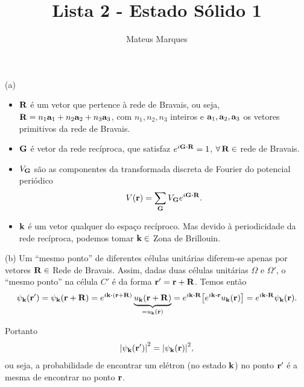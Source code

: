 \documentclass[a4paper,10pt]{article}
\title{\Huge{\textbf{Lista 2 - Estado Sólido 1}}}
\author{Mateus Marques}
\begin{document}
\maketitle

\section{}

(a)
\begin{itemize}
\item ${\vb{R}}$ é um vetor que pertence à rede de Bravais, ou seja, ${\vb{R}} = n_1 \vb{a}_1 + n_2 \vb{a}_2 + n_3 \vb{a}_3$, com $n_1,n_2,n_3$
inteiros e $\vb{a}_1,\vb{a}_2,\vb{a}_3$ os vetores primitivos da rede de Bravais.

\item ${\vb{G}}$ é vetor da rede recíproca, que satisfaz $e^{i \G \vdot \R} = 1$, $\forall \, {\vb{R}} \in$ rede de Bravais.

\item $V_{{\vb{G}}}$ são as componentes da transformada discreta de Fourier do potencial periódico
$$
V(\r) = \sum_{\G} V_{\G} e^{i \G \vdot \R}.
$$

\item ${\vb{k}}$ é um vetor qualquer do espaço recíproco. Mas devido à periodicidade da rede recíproca, podemos tomar ${\vb{k}} \in$ Zona de Brillouin.

\end{itemize}


(b) Um ``mesmo ponto'' de diferentes células unitárias diferem-se apenas por vetores ${\vb{R}} \in$ Rede de Bravais. Assim, dadas duas células unitárias $\Omega$ e $\Omega'$, o ``mesmo ponto'' na célula $C'$ é da forma ${\vb{r}}' = {\vb{r}} + {\vb{R}}$. Temos então
$$
\psi_\k(\r') = \psi_\k(\r+\R) = e^{i \k \vdot (\r+\R)} \underbrace{u_\k(\r+\R)}_{=u_\k(\r)} =
e^{i \k \vdot \R} \qty[e^{i\k\vdot\r} u_\k(\r)] = e^{i\k\vdot\R} \psi_\k(\r).
$$

Portanto
$$
\abs{\psi_{\vb{k}}({\vb{r}}')}^2 = \abs{\psi_{\vb{k}}({\vb{r}})}^2,
$$
ou seja, a probabilidade de encontrar um elétron (no estado ${\vb{k}}$) no ponto ${\vb{r}}'$ é a mesma de encontrar no ponto ${\vb{r}}$.


\pagebreak

\section{}
\end{document}
